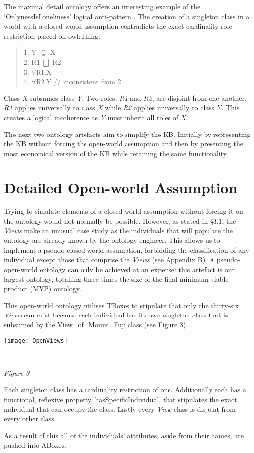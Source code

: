 \documentclass[titlepage,a4paper,12pt,oneside]{book}
\begin{document}
The maximal detail ontology offers an interesting example of the `OnlynessIsLoneliness' logical anti-pattern \cite[1]{antipatterns2009}.
The creation of a singleton class in a world with a closed-world assumption contradicts the exact cardinality role restriction placed on owl:Thing:
\begin{quote}
  1. Y $\subseteq$ X \\
  2. R1 $\bigsqcup$ R2 \\
  3. $\forall$R1.X \\ 
  4. $\forall$R2.Y // inconsistent from 2\\ 
\end{quote}
Class \textit{X} subsumes class \textit{Y}.
Two roles, \textit{R1} and \textit{R2}, are disjoint from one another.
\textit{R1} applies universally to class \textit{X} while \textit{R2} applies universally to class \textit{Y}.
This creates a logical incoherence as \textit{Y} must inherit all roles of \textit{X}.\par
The next two ontology artefacts aim to simplify the KB.
Initially by representing the KB without forcing the open-world assumption and then by presenting the most economical version of the KB while retaining the same functionality.

\section{Detailed Open-world Assumption}
Trying to simulate elements of a closed-world assumption without forcing it on the ontology would not normally be possible.
However, as stated in §3.1, the \textit{Views} make an unusual case study as the individuals that will populate the ontology are already known by the ontology engineer.
This allows us to implement a pseudo-closed-world assumption, forbidding the classification of any individual except those that comprise the \textit{Views} (see Appendix B).
A pseudo-open-world ontology can only be achieved at an expense: this artefact is our largest ontology, totalling three times the size of the final minimum viable product (MVP) ontology.\par
This open-world ontology utilises TBoxes to stipulate that only the thirty-six \textit{Views} can exist because each individual has its own singleton class that is subsumed by the View\_of\_Mount\_Fuji class (see Figure 3).
\newline
\centerline{\texttt{[image: OpenViews]}}\\
\centerline{\textit{Figure 3}}
\newline
Each singleton class has a cardinality restriction of one.
Additionally each has a functional, reflexive property, hasSpecificIndividual, that stipulates the exact individual that can occupy the class.
Lastly every \textit{View} class is disjoint from every other class.\par
As a result of this all of the individuals' attributes, aside from their names, are pushed into ABoxes.\par
\end{document}
